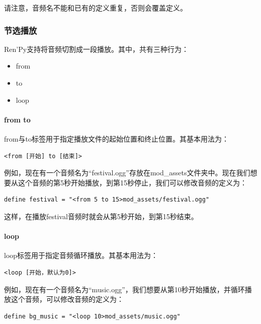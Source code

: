 \documentclass[../../Main.tex]{subfiles}
\begin{document}
请注意，音频名不能和已有的定义重复，否则会覆盖定义。

\subsubsection{节选播放}
Ren'Py支持将音频切割成一段播放。其中，共有三种行为：
\begin{itemize}
    \item from
    \item to
    \item loop
\end{itemize}

\paragraph{from to} from与to标签用于指定播放文件的起始位置和终止位置。其基本用法为：
\begin{lstlisting}
<from [开始] to [结束]>
\end{lstlisting}

例如，现在有一个音频名为“festival.ogg”存放在mod\_assets文件夹中。现在我们想要从这个音频的第5秒开始播放，到第15秒停止，我们可以修改音频的定义为：

\begin{lstlisting}
define festival = "<from 5 to 15>mod_assets/festival.ogg"
\end{lstlisting}

这样，在播放festival音频时就会从第5秒开始，到第15秒结束。

\paragraph{loop} loop标签用于指定音频循环播放。其基本用法为：

\begin{lstlisting}
<loop [开始，默认为0]>
\end{lstlisting}

例如，现在有一个音频名为“music.ogg”，我们想要从第10秒开始播放，并循环播放这个音频，可以修改音频的定义为：

\begin{lstlisting}
define bg_music = "<loop 10>mod_assets/music.ogg"
\end{lstlisting}
\end{document}
